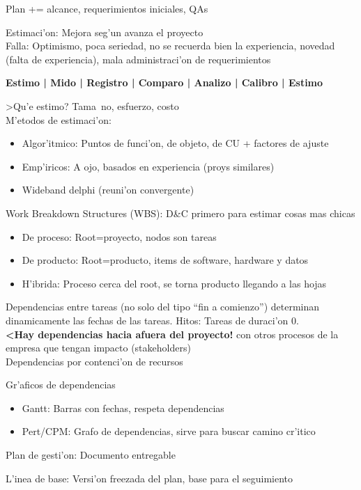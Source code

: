 \documentclass[a4paper,spanish]{article}
\newcommand{\tab}[0]{\hspace*{0.5cm}}
\begin{document}
Plan += alcance, requerimientos iniciales, QAs

Estimaci'on: Mejora seg'un avanza el proyecto \\
\tab Falla: Optimismo, poca seriedad, no se recuerda bien la experiencia, 
	novedad (falta de experiencia), mala administraci'on de requerimientos
	
\textbf{Estimo | Mido | Registro | Comparo | Analizo | Calibro | Estimo}

>Qu'e estimo? Tama~no, esfuerzo, costo \\
M'etodos de estimaci'on:
\begin{itemize}
\item Algor'itmico: Puntos de funci'on, de objeto, de CU + factores de ajuste
\item Emp'iricos: A ojo, basados en experiencia (proys similares)
\item Wideband delphi (reuni'on convergente)
\end{itemize}

Work Breakdown Structures (WBS): D\&C primero para estimar cosas mas chicas
\begin{itemize}
\item De proceso: Root=proyecto, nodos son tareas
\item De producto: Root=producto, items de software, hardware y datos
\item H'ibrida: Proceso cerca del root, se torna producto llegando a las hojas
\end{itemize}

Dependencias entre tareas (no solo del tipo ``fin a comienzo'') determinan
	dinamicamente las fechas de las tareas. Hitos: Tareas de duraci'on 0. \\
\textbf{<Hay dependencias hacia afuera del proyecto!} con otros procesos de la
empresa que tengan impacto (stakeholders) \\
Dependencias por contenci'on de recursos

Gr'aficos de dependencias
\begin{itemize}
\item Gantt: Barras con fechas, respeta dependencias
\item Pert/CPM: Grafo de dependencias, sirve para buscar camino cr'itico
\end{itemize}

Plan de gesti'on: Documento entregable

L'inea de base: Versi'on freezada del plan, base para el seguimiento
\end{document}
